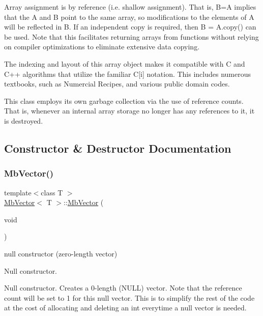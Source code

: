 Array assignment is by reference (i.\+e. shallow assignment). That is, B=A implies that the A and B point to the same array, so modifications to the elements of A will be reflected in B. If an independent copy is required, then B = A.\+copy() can be used. Note that this facilitates returning arrays from functions without relying on compiler optimizations to eliminate extensive data copying.

The indexing and layout of this array object makes it compatible with C and C++ algorithms that utilize the familiar C\mbox{[}i\mbox{]} notation. This includes numerous textbooks, such as Numercial Recipes, and various public domain codes.

This class employs its own garbage collection via the use of reference counts. That is, whenever an internal array storage no longer has any references to it, it is destroyed. 

\subsection{Constructor \& Destructor Documentation}
\mbox{\label{class_mb_vector_a34994ea552d4d102c8b1f715deb994dc}} 
\subsubsection{\texorpdfstring{MbVector()}{MbVector()}\hspace{0.1cm}{\footnotesize\ttfamily [1/5]}}
{\footnotesize\ttfamily template$<$class T $>$ \\
\mbox{\hyperlink{class_mb_vector}{Mb\+Vector}}$<$ T $>$\+::\mbox{\hyperlink{class_mb_vector}{Mb\+Vector}} (\begin{DoxyParamCaption}\item[{void}]{ }\end{DoxyParamCaption})}



null constructor (zero-\/length vector) 

Null constructor.

Null constructor. Creates a 0-\/length (N\+U\+LL) vector. Note that the reference count will be set to 1 for this null vector. This is to simplify the rest of the code at the cost of allocating and deleting an int everytime a null vector is needed. \mbox{\label{class_mb_vector_a456d0204f259781913d6c628879a2322}} 
